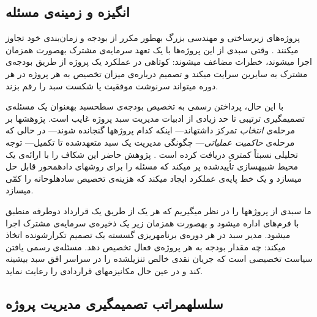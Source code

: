 
\subsection{انگیزه و زمینه‌ی مسئله}
\label{subsec:motivation}

پروژه‌های زیرساختی و مهندسی بزرگ به\zwnj{}طور مکرر از بودجه و زمان‌بندی
خود تجاوز می\zwnj{}کنند \citep{Flyvbjerg2003, Merrow2011}.
وقتی سبدی از این پروژه‌ها با یک تعهد سرمایه‌ی مشترک به\zwnj{}صورت
هم\zwnj{}زمان اجرا می\zwnj{}شوند، خطرات مضاعف می\zwnj{}شوند:
کوتاهی در عملکرد یک پروژه از طریق بودجه‌ی مشترک به سایرین
سرایت می\zwnj{}کند و تصمیم درباره‌ی میزان تخصیص به هر پروژه
در هر دوره می\zwnj{}تواند سرنوشت موفقیت یا شکست سبد را رقم بزند.

با این حال، پرداختن رسمی به تخصیص بودجه‌ی سطح\zwnj{}سبد به\zwnj{}عنوان
یک مسئله‌ی تصمیم\zwnj{}گیری ترتیبی تا حد زیادی از ادبیات مدیریت
سبد پروژه غایب است.
پژوهش\zwnj{}ها بر مرحله‌ی \emph{انتخاب} تمرکز داشته\zwnj{}اند---
اینکه کدام پروژه\zwnj{}ها گنجانده شوند---
در حالی که مرحله‌ی \emph{حاکمیت عملیاتی}---
چگونگی مدیریت یک سبد متعهدشده تا تکمیل---
توجه تحلیلی نسبتاً کمتری دریافت کرده است
\citep{Archer1999, Cooper2001, Turner2014}.
پژوهش حاضر این شکاف را با ارائه‌ی یک محیط شبیه\zwnj{}سازی تأییدشده
پر می\zwnj{}کند که مسئله را برای روش\zwnj{}های داده\zwnj{}محور قابل حل
می\zwnj{}سازد و یک خط پایه‌ی عملکرد ایجاد می\zwnj{}کند که هزینه‌ی
تخصیص ساده\zwnj{}لوحانه را کمّی می\zwnj{}سازد.

ما سبدی از پروژه\zwnj{}ها را در نظر می\zwnj{}گیریم که هر یک از طریق
یک قرارداد دوطرفه منطبق با فرم‌های  \citep{FIDIC2017}
اداره می\zwnj{}شود و به\zwnj{}صورت هم\zwnj{}زمان زیر یک ذخیره‌ی سرمایه‌ی مشترک
اجرا می\zwnj{}شود.
مدیر سبد در هر دوره‌ی برنامه\zwnj{}ریزی گسسته یک تصمیم تکرارشونده
اتخاذ می\zwnj{}کند: چه مقدار بودجه به هر پروژه‌ی فعال تخصیص دهد.
مسئله‌ی رسمی یافتن سیاست تخصیصی است که جریان نقدی خالص تنزیل\zwnj{}شده
را در سراسر افق سبد بیشینه کند و در عین حال مکانیزم\zwnj{}های قراردادی
را رعایت نماید.

\subsection{سلسله\zwnj{}مراتب تصمیم\zwnj{}گیری مدیریت پروژه}
\label{subsec:hierarchy}

